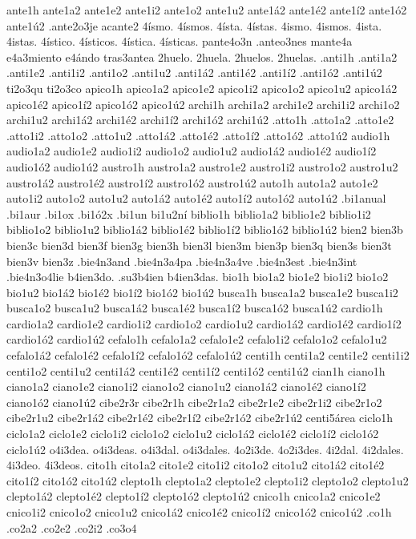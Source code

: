 {ante1h
ante1a2 ante1e2 ante1i2 ante1o2 ante1u2
ante1á2 ante1é2 ante1í2 ante1ó2 ante1ú2
.ante2o3je
acante2
4ísmo.
4ísmos.
4ísta.
4ístas.
4ismo.
4ismos.
4ista.
4istas.
4ístico.
4ísticos.
4ística.
4ísticas.
pante4o3n
.anteo3nes
mante4a
e4a3miento
e4ándo
tras3antea
2huelo.
2huela.
2huelos.
2huelas.
.anti1h
.anti1a2 .anti1e2 .anti1i2 .anti1o2 .anti1u2
.anti1á2 .anti1é2 .anti1í2 .anti1ó2 .anti1ú2
ti2o3qu
ti2o3co
apico1h
apico1a2 apico1e2 apico1i2 apico1o2 apico1u2
apico1á2 apico1é2 apico1í2 apico1ó2 apico1ú2
archi1h
archi1a2 archi1e2 archi1i2 archi1o2 archi1u2
archi1á2 archi1é2 archi1í2 archi1ó2 archi1ú2
.atto1h
.atto1a2 .atto1e2 .atto1i2 .atto1o2 .atto1u2
.atto1á2 .atto1é2 .atto1í2 .atto1ó2 .atto1ú2
audio1h
audio1a2 audio1e2 audio1i2 audio1o2 audio1u2
audio1á2 audio1é2 audio1í2 audio1ó2 audio1ú2
austro1h
austro1a2 austro1e2 austro1i2 austro1o2 austro1u2
austro1á2 austro1é2 austro1í2 austro1ó2 austro1ú2
auto1h
auto1a2 auto1e2 auto1i2 auto1o2 auto1u2
auto1á2 auto1é2 auto1í2 auto1ó2 auto1ú2
.bi1anual
.bi1aur
.bi1ox
.bi1ó2x
.bi1un
bi1u2ní
biblio1h
biblio1a2 biblio1e2 biblio1i2 biblio1o2 biblio1u2
biblio1á2 biblio1é2 biblio1í2 biblio1ó2 biblio1ú2
bien2
bien3b
bien3c
bien3d
bien3f
bien3g
bien3h
bien3l
bien3m
bien3p
bien3q
bien3s
bien3t
bien3v
bien3z
.bie4n3and
.bie4n3a4pa
.bie4n3a4ve
.bie4n3est
.bie4n3int
.bie4n3o4lie
b4ien3do.
.su3b4ien
b4ien3das.
bio1h
bio1a2 bio1e2 bio1i2 bio1o2 bio1u2
bio1á2 bio1é2 bio1í2 bio1ó2 bio1ú2
busca1h
busca1a2 busca1e2 busca1i2 busca1o2 busca1u2
busca1á2 busca1é2 busca1í2 busca1ó2 busca1ú2
cardio1h
cardio1a2 cardio1e2 cardio1i2 cardio1o2 cardio1u2
cardio1á2 cardio1é2 cardio1í2 cardio1ó2 cardio1ú2
cefalo1h
cefalo1a2 cefalo1e2 cefalo1i2 cefalo1o2 cefalo1u2
cefalo1á2 cefalo1é2 cefalo1í2 cefalo1ó2 cefalo1ú2
centi1h
centi1a2 centi1e2 centi1i2 centi1o2 centi1u2
centi1á2 centi1é2 centi1í2 centi1ó2 centi1ú2
cian1h
ciano1h
ciano1a2 ciano1e2 ciano1i2 ciano1o2 ciano1u2
ciano1á2 ciano1é2 ciano1í2 ciano1ó2 ciano1ú2
cibe2r3r
cibe2r1h
cibe2r1a2 cibe2r1e2 cibe2r1i2 cibe2r1o2 cibe2r1u2
cibe2r1á2 cibe2r1é2 cibe2r1í2 cibe2r1ó2 cibe2r1ú2
centi5área
ciclo1h
ciclo1a2 ciclo1e2 ciclo1i2 ciclo1o2 ciclo1u2
ciclo1á2 ciclo1é2 ciclo1í2 ciclo1ó2 ciclo1ú2
o4i3dea.
o4i3deas.
o4i3dal.
o4i3dales.
4o2i3de.
4o2i3des.
4i2dal.
4i2dales.
4i3deo.
4i3deos.
cito1h
cito1a2 cito1e2 cito1i2 cito1o2 cito1u2
cito1á2 cito1é2 cito1í2 cito1ó2 cito1ú2
clepto1h
clepto1a2 clepto1e2 clepto1i2 clepto1o2 clepto1u2
clepto1á2 clepto1é2 clepto1í2 clepto1ó2 clepto1ú2
cnico1h
cnico1a2 cnico1e2 cnico1i2 cnico1o2 cnico1u2
cnico1á2 cnico1é2 cnico1í2 cnico1ó2 cnico1ú2
.co1h
.co2a2
.co2e2
.co2i2
.co3o4
}
